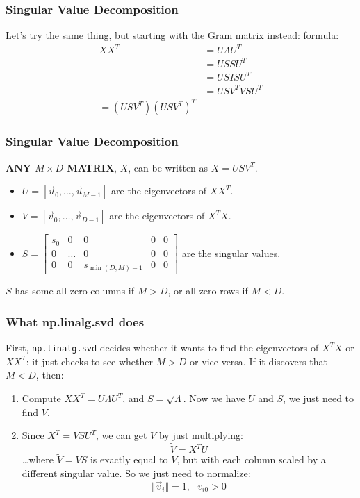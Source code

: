 \documentclass{beamer}
\begin{document}
\begin{frame}
  \frametitle{Singular Value Decomposition}

  Let's try the same thing, but starting with the Gram matrix instead:
  formula:
  \begin{align*}
    XX^T&= U\Lambda U^T\\
    &= USSU^T\\
    &= USISU^T\\
    &= USV^TVSU^T\\
    = (USV^T)(USV^T)^T
  \end{align*}
\end{frame}

\begin{frame}
  \frametitle{Singular Value Decomposition}
  {\bf ANY $M\times D$ MATRIX}, $X$, can be written as $X=USV^T$.
  \begin{itemize}
  \item $U=[\vec{u}_0,\ldots,\vec{u}_{M-1}]$ are the eigenvectors of $XX^T$.
  \item $V=[\vec{v}_0,\ldots,\vec{v}_{D-1}]$ are the eigenvectors of $X^TX$.
  \item $S=\left[\begin{array}{ccccc}s_0&0&0&0&0\\0&\ldots&0&0&0\\0&0&s_{\min(D,M)-1}&0&0\end{array}\right]$ are the singular values.
  \end{itemize}
  $S$ has some all-zero columns if $M>D$, or all-zero rows if $M<D$.
\end{frame}

\begin{frame}
  \frametitle{What np.linalg.svd does}
  First, {\tt np.linalg.svd} decides whether it wants to find the eigenvectors of
  $X^TX$ or $XX^T$: it just checks to see whether $M>D$ or vice versa.
  If it discovers that $M<D$, then:
  \begin{enumerate}
  \item Compute  $XX^T=U\Lambda U^T$, and $S=\sqrt{\Lambda}$.
    Now we have $U$ and $S$, we just need to  find $V$.
  \item Since $X^T=VSU^T$, we can get $V$ by just multiplying:
    \[
    \tilde{V} = X^TU
    \]
    \ldots where $\tilde{V}=VS$ is exactly equal to $V$, but with each column
    scaled by a different singular value.  So we just need to normalize:
    \[
    \Vert\vec{v}_i\Vert=1,~~~v_{i0}>0
    \]
  \end{enumerate}
\end{frame}
\end{document}
